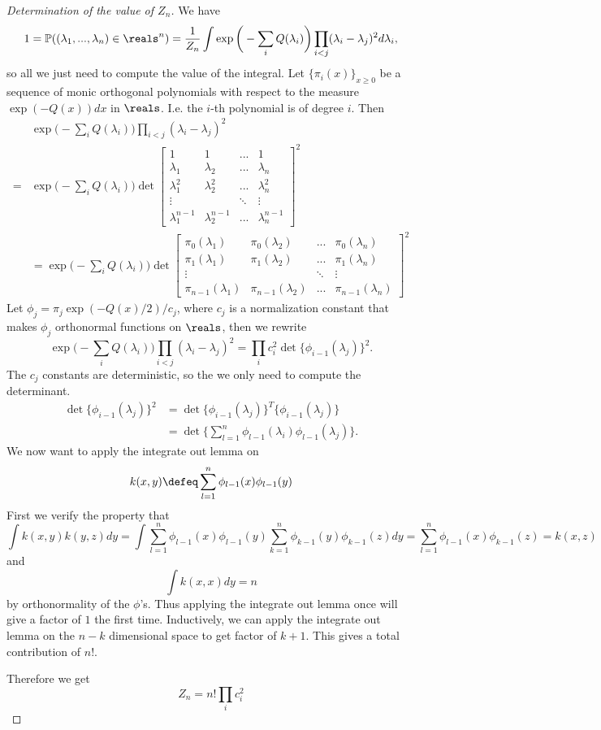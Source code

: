 \begin{proof}[Determination of the value of $Z_n$]
We have \[
1 = \mathbb{P}((\lambda_1,...,\lambda_n) \in \reals^n) = \frac{1}{Z_n}\int \exp\bigg(- \sum_{i} Q(\lambda_i)\bigg)\prod_{i<j}(\lambda_i -\lambda_j)^2 d\lambda_i,
\]
so all we just need to compute the value of the integral.
Let $\{\pi_i(x)\}_{x\geq 0}$ be a sequence of monic orthogonal polynomials with respect to the measure $\exp ( -Q(x)) dx$ in $\reals$. I.e. the $i$-th polynomial is of degree $i$. Then \begin{align*}
    &\exp\bigg(- \sum_{i} Q(\lambda_i)\bigg)\prod_{i<j}(\lambda_i -\lambda_j)^2 \\
    =&\exp\bigg(- \sum_{i} Q(\lambda_i)\bigg)\det
    \begin{bmatrix}
        1 & 1 & ... & 1 \\
        \lambda_1 & \lambda_2 & ... & \lambda_n \\ 
        \lambda_1^2& \lambda_2^2 & ... & \lambda_n^2\\
        \vdots & &\ddots&\vdots\\
        \lambda_1^{n-1}&\lambda_2^{n-1}&...&\lambda_n^{n-1}
    \end{bmatrix}^2\\
    &=\exp\bigg(- \sum_{i} Q(\lambda_i)\bigg)
    \det \begin{bmatrix}
        \pi_0(\lambda_1) & \pi_0(\lambda_2) & ... & \pi_0(\lambda_n) \\
       \pi_1(\lambda_1) & \pi_1(\lambda_2)& ... & \pi_1(\lambda_n) \\
        \vdots & &\ddots&\vdots\\
        \pi_{n-1}(\lambda_1)&\pi_{n-1}(\lambda_2)&...&\pi_{n-1}(\lambda_n)
    \end{bmatrix}^2
\end{align*}
Let $\phi_j = \pi_j \exp (-Q(x)/2) /c_j$, where $c_j$ is a normalization constant that makes $\phi_j$ orthonormal functions on $\reals$, then we rewrite\[
\exp\bigg(- \sum_{i} Q(\lambda_i)\bigg)\prod_{i<j}(\lambda_i -\lambda_j)^2 = \prod_{i}c_i^2 \det \{\phi_{i-1}(\lambda_j)\}^2.
\]
The $c_j$ constants are deterministic, so the we only need to compute the determinant.
\begin{align*}
    \det \{\phi_{i-1}(\lambda_j)\}^2 &= \det \{\phi_{i-1}(\lambda_j)\}^T \{\phi_{i-1}(\lambda_j)\}\\
    &= \det \{\sum_{l=1}^{n}\phi_{l-1}(\lambda_i)\phi_{l-1}(\lambda_j)\}.
\end{align*}
We now want to apply the integrate out lemma on \[
k(x,y) \defeq \sum_{l=1}^{n}\phi_{l-1}(x)\phi_{l-1}(y)
\]
First we verify the property that \[
\int k(x,y)k(y,z) dy = \int \sum_{l=1}^{n}\phi_{l-1}(x)\phi_{l-1}(y) \sum_{k=1}^{n}\phi_{k-1}(y)\phi_{k-1}(z) dy = \sum_{l=1}^{n}\phi_{l-1}(x)\phi_{k-1}(z) = k(x,z)
\] 
and \[
\int k(x,x) dy = n
\]
by orthonormality of the $\phi$'s.
Thus applying the integrate out lemma once will give a factor of $1$ the first time. Inductively, we can apply the integrate out lemma on the $n-k$ dimensional space to get factor of $k+1$. This gives a total contribution of $n!$.

Therefore we get \[
Z_n=n! \prod_i c_i^2
\]
\end{proof}